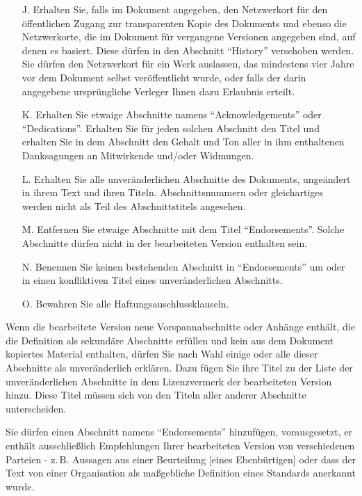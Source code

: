 \begin{itemize}
\item[J.]
   Erhalten Sie, falls im Dokument angegeben, den Netzwerkort für den öffentlichen Zugang
   zur transparenten Kopie des Dokuments und ebenso die Netzwerkorte, die im Dokument für 
   vergangene Versionen angegeben sind, auf denen es basiert.
   Diese dürfen in den Abschnitt "`History"' verschoben werden.
   Sie dürfen den Netzwerkort für ein Werk auslassen, das mindestens vier Jahre vor dem
   Dokument selbst veröffentlicht wurde, oder falls der darin angegebene ursprüngliche
   Verleger Ihnen dazu Erlaubnis erteilt.
   
\item[K.]
   Erhalten Sie etwaige Abschnitte namens "`Acknowledgements"' oder "`Dedications"'.
   Erhalten Sie für jeden solchen Abschnitt den Titel und erhalten Sie in dem Abschnitt den Gehalt und
   Ton aller in ihm enthaltenen Danksagungen an Mitwirkende und/oder Widmungen.
   
\item[L.]
   Erhalten Sie alle unveränderlichen Abschnitte des Dokuments,
   ungeändert in ihrem Text und ihren Titeln. Abschnittsnummern
   oder gleichartiges werden nicht als Teil des Abschnittstitels angesehen.
   
\item[M.]
   Entfernen Sie etwaige Abschnitte mit dem Titel "`Endorsements"'. Solche Abschnitte
   dürfen nicht in der bearbeiteten Version enthalten sein.
   
\item[N.]
   Benennen Sie keinen bestehenden Abschnitt in "`Endorsements"' um
   oder in einen konfliktiven Titel eines unveränderlichen Abschnitts.
   
\item[O.]
   Bewahren Sie alle Haftungsauschlussklauseln.
\end{itemize}

Wenn die bearbeitete Version neue Vorspannabschnitte oder Anhänge enthält, 
die die Definition als sekundäre Abschnitte erfüllen und kein aus dem Dokument
kopiertes Material enthalten, dürfen Sie nach Wahl einige oder alle dieser
Abschnitte als unveränderlich erklären. Dazu fügen Sie ihre Titel zu der Liste
der unveränderlichen Abschnitte in dem Lizenzvermerk der bearbeiteten Version hinzu. 
Diese Titel müssen sich von den Titeln aller anderer Abschnitte unterscheiden.

Sie dürfen einen Abschnitt namens "`Endorsements"' hinzufügen, vorausgesetzt, er enthält
ausschließlich Empfehlungen Ihrer bearbeiteten Version von verschiedenen
Parteien - z.\,B. Aussagen aus einer Beurteilung [eines Ebenbürtigen] oder dass der Text
von einer Organisation als maßgebliche Definition eines Standards anerkannt wurde.

